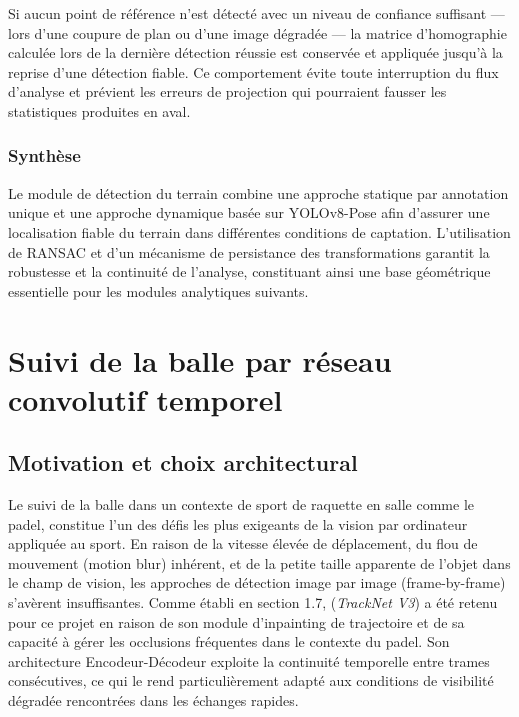 Si aucun point de référence n'est détecté avec un niveau de confiance suffisant — lors d'une coupure de plan ou d'une image dégradée — la matrice d'homographie calculée lors de la dernière détection réussie est conservée et appliquée jusqu'à la reprise d'une détection fiable. Ce comportement évite toute interruption du flux d'analyse et prévient les erreurs de projection qui pourraient fausser les statistiques produites en aval.

\subsubsection{Synthèse}


Le module de détection du terrain combine une approche statique par annotation unique et une approche dynamique basée sur YOLOv8-Pose afin d’assurer une localisation fiable du terrain dans différentes conditions de captation. L’utilisation de RANSAC et d’un mécanisme de persistance des transformations garantit la robustesse et la continuité de l’analyse, constituant ainsi une base géométrique essentielle pour les modules analytiques suivants.

\section{Suivi de la balle par réseau convolutif temporel}
\label{sec:ball_tracking}
 
\subsection{Motivation et choix architectural}
\label{subsec:motivation}
 
Le suivi de la balle dans un contexte de sport de raquette en salle comme le padel,
constitue l’un des défis les plus exigeants de la vision par ordinateur appliquée au sport. En
raison de la vitesse élevée de déplacement, du flou de mouvement (motion blur) inhérent,
et de la petite taille apparente de l’objet dans le champ de vision, les approches de
détection image par image (frame-by-frame) s’avèrent insuﬀisantes.
Comme établi en section 1.7, (\textit{TrackNet V3}) a été retenu pour ce projet en raison de 
son module d'inpainting de trajectoire et de sa capacité à gérer les occlusions 
fréquentes dans le contexte du padel. Son architecture Encodeur-Décodeur exploite 
la continuité temporelle entre trames consécutives, ce qui le rend particulièrement 
adapté aux conditions de visibilité dégradée rencontrées dans les échanges rapides.
 

